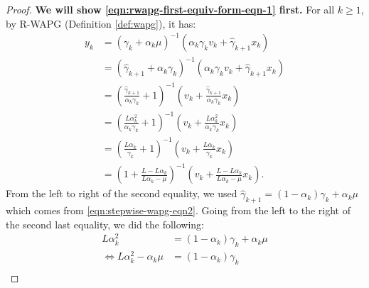 \documentclass[12pt]{article}
\begin{document}
        \begin{proof}
            \textbf{We will show \eqref{eqn:rwapg-first-equiv-form-eqn-1} first.} 
            For all $k \ge 1$, by R-WAPG (Definition \ref{def:wapg}), it has: 
            \begin{align*}
                y_{k} &= 
                (\gamma_k + \alpha_k \mu)^{-1}
                (\alpha_k \gamma_k v_k + \hat \gamma_{k + 1}x_k)
                \\
                &= 
                (\hat \gamma_{k + 1} + \alpha_k \gamma_k)^{-1}
                (\alpha_k \gamma_k v_k + \hat \gamma_{k + 1}x_k)
                \\
                &= 
                \left(
                    \frac{\hat \gamma_{k + 1}}{\alpha_k\gamma_k} + 1
                \right)^{-1}
                \left(
                    v_k + \frac{\hat \gamma_{k + 1}}{\alpha_k \gamma_k} x_k
                \right)
                \\
                &= 
                \left(
                    \frac{L\alpha_k^2}{\alpha_k\gamma_k} + 1
                \right)^{-1}
                \left(
                    v_k + \frac{L\alpha_k^2}{\alpha_k \gamma_k} x_k
                \right)
                \\
                &= 
                \left(
                    \frac{L\alpha_k}{\gamma_k} + 1
                \right)^{-1}
                \left(
                    v_k + \frac{L\alpha_k}{ \gamma_k} x_k
                \right)
                \\
                &= 
                \left(
                    1 + \frac{L - L \alpha_k}{L \alpha_k - \mu}
                \right)^{-1}
                \left(
                    v_k + 
                    \frac{L - L \alpha_k}{L \alpha_k - \mu} x_k
                \right). 
            \end{align*}
            From the left to right of the second equality, we used $\hat \gamma_{k + 1} = (1 - \alpha_k)\gamma_k + \alpha_k\mu$ which comes from \eqref{eqn:stepwise-wapg-eqn2}. 
            Going from the left to the right of the second last equality, we did the following: 
            \begin{align*}
                L\alpha_k^2 &= 
                (1 - \alpha_k)\gamma_k + \alpha_k \mu 
                \\
                \iff 
                L \alpha_k^2 - \alpha_k\mu &= 
                (1 - \alpha_k)\gamma_k
                \\

\end{align*}
\end{proof}
\end{document}
